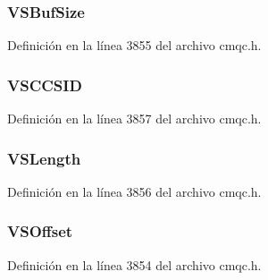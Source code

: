 \subsubsection[{V\+S\+Buf\+Size}]{ V\+S\+Buf\+Size}\label{structtag_m_q_c_h_a_r_v_a0ecb35cb9ecf6eeab94b1c8b56160da5}


Definición en la línea 3855 del archivo cmqc.\+h.

\hypertarget{structtag_m_q_c_h_a_r_v_a48f906627aeadf5b2aaf1d4fc7cd03e0}{}
\subsubsection[{V\+S\+C\+C\+S\+I\+D}]{ V\+S\+C\+C\+S\+I\+D}\label{structtag_m_q_c_h_a_r_v_a48f906627aeadf5b2aaf1d4fc7cd03e0}


Definición en la línea 3857 del archivo cmqc.\+h.

\hypertarget{structtag_m_q_c_h_a_r_v_af59afd9bc843f5c5b554dfaad410233b}{}
\subsubsection[{V\+S\+Length}]{ V\+S\+Length}\label{structtag_m_q_c_h_a_r_v_af59afd9bc843f5c5b554dfaad410233b}


Definición en la línea 3856 del archivo cmqc.\+h.

\hypertarget{structtag_m_q_c_h_a_r_v_a2211c15f7346cc2cd5a153b70d55d051}{}
\subsubsection[{V\+S\+Offset}]{ V\+S\+Offset}\label{structtag_m_q_c_h_a_r_v_a2211c15f7346cc2cd5a153b70d55d051}


Definición en la línea 3854 del archivo cmqc.\+h.

